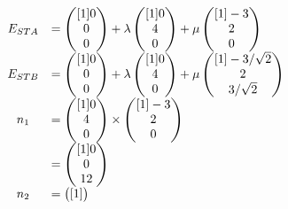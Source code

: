 \documentclass[main.tex]{subfiles}
\begin{document}
\begin{gather*}
    \begin{array}{ c l }
        E_{STA} & =\begin{pmatrix}[1]
        0\\
        0\\
        0
        \end{pmatrix} +\lambda \begin{pmatrix}[1]
        0\\
        4\\
        0
        \end{pmatrix} +\mu \begin{pmatrix}[1]
        -3\\
        2\\
        0
        \end{pmatrix}\\
        E_{STB} & =\begin{pmatrix}[1]
        0\\
        0\\
        0
        \end{pmatrix} +\lambda \begin{pmatrix}[1]
        0\\
        4\\
        0
        \end{pmatrix} +\mu \begin{pmatrix}[1]
        -3/\sqrt{2}\\
        2\\
        3/\sqrt{2}
        \end{pmatrix}\\
        n_{1} & =\begin{pmatrix}[1]
        0\\
        4\\
        0
        \end{pmatrix} \times \begin{pmatrix}[1]
        -3\\
        2\\
        0
        \end{pmatrix}\\
        & =\begin{pmatrix}[1]
        0\\
        0\\
        12
        \end{pmatrix}\\
        n_{2} & =\begin{pmatrix}[1]

\end{pmatrix}
\end{array}
\end{gather*}
\end{document}
